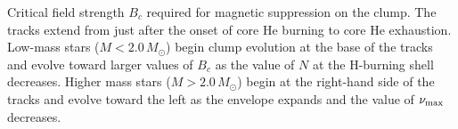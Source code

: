\label{fig:BcClump}
Critical field strength $B_c$ required for magnetic suppression on the clump. The tracks extend from just after the onset of core He burning to core He exhaustion. Low-mass stars ($M<2.0 \, M_\odot$) begin clump evolution at the base of the tracks and evolve toward larger values of $B_c$ as the value of $N$ at the H-burning shell decreases. Higher mass stars ($M>2.0 \, M_\odot$) begin at the right-hand side of the tracks and evolve toward the left as the envelope expands and the value of $\nu_{\rm max}$ decreases.
